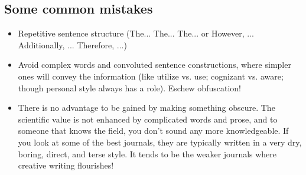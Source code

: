 \subsection*{Some common mistakes}
\begin{itemize}
  \item Repetitive sentence structure (The... The... The... or However, ... Additionally, ...
  Therefore, ...)
  \item Avoid complex words and convoluted sentence constructions, where simpler ones will convey
  the information (like utilize vs. use; cognizant vs. aware; though personal style always has a role). 
  Eschew obfuscation!
  \item There is no advantage to be gained by making something obscure. The scientific value is not
  enhanced by complicated words and prose, and to someone that knows the field, you don’t sound any
  more knowledgeable. If you look at some of the best journals, they are typically written in a very 
  dry, boring, direct, and terse style. It tends to be the weaker journals where creative writing 
  flourishes! 
\end{itemize}

